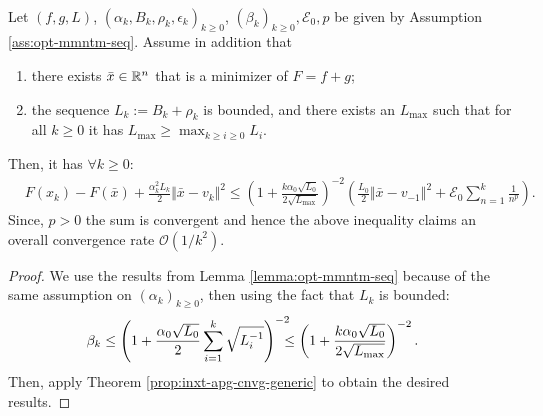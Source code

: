 \documentclass[12pt]{article}
\begin{document}
        \begin{proposition}\;\label{prop:opt-cnvg-outr-loop}\\
            Let $(f, g, L)$, $(\alpha_k, B_k, \rho_k, \epsilon_k)_{k \ge 0}$, $(\beta_k)_{k\ge 0}, \mathcal E_0, p$ be given by Assumption \ref{ass:opt-mmntm-seq}. 
            Assume in addition that
            \begin{enumerate}[nosep]
                \item there exists $\bar x \in \mathbb R^n$ that is a minimizer of $F = f + g$;
                \item the sequence $L_k := B_k + \rho_k$ is bounded, and there exists an $L_{\max}$ such that for all $k \ge 0$ it has $L_{\max} \ge \max_{k\ge i\ge 0} L_i$. 
            \end{enumerate}
            Then, it has $\forall k \ge 0$: 
            \begin{align*}
                & F(x_k) - F(\bar x) + \frac{\alpha_k^2L_k}{2}\Vert \bar x - v_k\Vert^2
                \le 
                \left(
                    1 + \frac{k\alpha_0\sqrt{L_0}}{2\sqrt{L_{\max}}}
                \right)^{-2}\left(
                    \frac{L_0}{2}\Vert \bar x - v_{-1}\Vert^2
                    + \mathcal E_0 \sum_{n = 1}^{k} \frac{1}{n^p}
                \right). 
            \end{align*}
            Since, $p > 0$ the sum is convergent and hence the above inequality claims an overall convergence rate $\mathcal O(1/k^2)$. 
        \end{proposition}
        \begin{proof}
            We use the results from Lemma \ref{lemma:opt-mmntm-seq} because of the same assumption on $(\alpha_k)_{k 
            \ge 0}$, then using the fact that $L_k$ is bounded: 
            \begin{align*}
                \beta_k &\le 
                \left(
                    1 + \frac{\alpha_0\sqrt{L_0}}{2}\sum_{i = 1}^{k} \sqrt{L_i^{-1}}
                \right)^{-2}
                \hspace{-0.7em}\le 
                \left(
                    1 + \frac{k\alpha_0\sqrt{L_0}}{2\sqrt{L_{\max}}}
                \right)^{-2}. 
            \end{align*}
            Then, apply Theorem \ref{prop:inxt-apg-cnvg-generic} to obtain the desired results.
        \end{proof}
\end{document}
